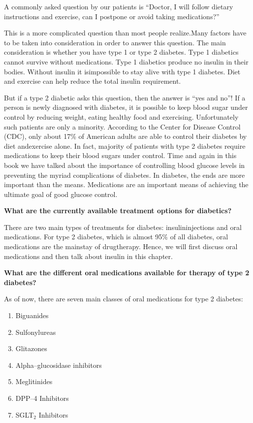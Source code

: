 A commonly asked question by our patients is “Doctor, I will follow dietary instructions and exercise, can I postpone or avoid taking medi\-cations?”

This is a more complicated question than most people realize.\break Many factors have to be taken into consideration in order to answer this question. The main consideration is whether you have type 1 or type 2 diabetes. Type 1 diabetics cannot survive without medications. Type 1 diabetics produce no insulin in their bodies. Without insulin it is\break impossible to stay alive with type 1 diabetes. Diet and exercise can help reduce the total insulin requirement.

But if a type 2 diabetic asks this question, then the answer is “yes and no”! If a person is newly diagnosed with diabetes, it is possible to keep blood sugar under control by reducing weight, eating healthy food and exercising. Unfortunately such patients are only a mino\-rity. According to the Center for Disease Control (CDC), only about 17\% of American adults are able to control their diabetes by diet and\break exercise alone. In fact, majority of patients with type 2 diabetes require medications to keep their blood sugars under control. Time and again in this book we have talked about the importance of controlling blood glucose levels in preventing the myriad complications of diabetes. In diabetes, the ends are more important than the means. Medications are an important means of achieving the ultimate goal of good glucose control.

\clearpage

\noindent\textbf{What are the currently available treatment options for diabetics?}

There are two main types of treatments for diabetes: insulin\break injections and oral medications. For type 2 diabetes, which is almost 95\% of all diabetes, oral medications are the mainstay of drug\break therapy. Hence, we will first discuss oral medications and then talk about insulin in this chapter.

\vskip 6pt

\noindent\textbf{What are the different oral medications available for therapy of type 2 diabetes?}

As of now, there are seven main classes of oral medications for type 2 diabetes:

\vspace{-\topsep}
\begin{enumerate}[•]
\itemsep=0pt
\item Biguanides
\item Sulfonylureas
\item Glitazones
\item Alpha–glucosidase inhibitors
\item Meglitinides
\item DPP–4 Inhibitors
\item SGLT$_{\text{2}}$ Inhibitors
\end{enumerate}
\vspace{-\topsep}

